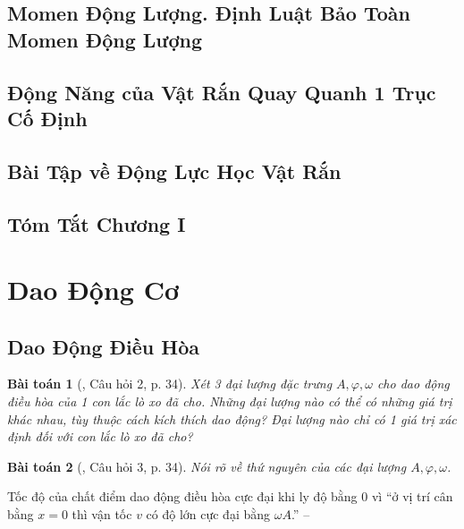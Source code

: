 \documentclass{article}
\numberwithin{equation}{section}
\newtheorem{baitoan}{Bài toán}[section]
\begin{document}
\subsection{Momen Động Lượng. Định Luật Bảo Toàn Momen Động Lượng}


\subsection{Động Năng của Vật Rắn Quay Quanh 1 Trục Cố Định}


\subsection{Bài Tập về Động Lực Học Vật Rắn}


\subsection{Tóm Tắt Chương I}


\section{Dao Động Cơ}

\subsection{Dao Động Điều Hòa}

\begin{baitoan}[\cite{SGK_Vat_Ly_12_nang_cao}, Câu hỏi 2, p. 34]
	Xét 3 đại lượng đặc trưng $A,\varphi,\omega$ cho dao động điều hòa của 1 con lắc lò xo đã cho. Những đại lượng nào có thể có những giá trị khác nhau, tùy thuộc cách kích thích dao động? Đại lượng nào chỉ có 1 giá trị xác định đối với con lắc lò xo đã cho?
\end{baitoan}

\begin{baitoan}[\cite{SGK_Vat_Ly_12_nang_cao}, Câu hỏi 3, p. 34]
	Nói rõ về thứ nguyên của các đại lượng $A,\varphi,\omega$.
\end{baitoan}
Tốc độ của chất điểm dao động điều hòa cực đại khi ly độ bằng $0$ vì ``ở vị trí cân bằng $x = 0$ thì vận tốc $v$ có độ lớn cực đại bằng $\omega A$.'' -- \cite[p. 32]{SGK_Vat_Ly_12_nang_cao}
\end{document}
